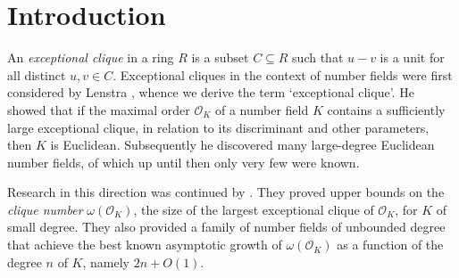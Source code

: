 \documentclass{amsart}
\theoremstyle{plain}
\theoremstyle{definition}
\newcommand{\clq}{C}
\newcommand{\note}[1]{\textbf{\color{blue}#1}}
\newcommand{\inote}[1]{\textbf{\color{red}Ignacio: #1}}
\begin{document}

\section{Introduction}

An \emph{exceptional clique} in a ring \(R\) is a subset \(\clq\subseteq R\) such that \(u-v\) is a unit for all distinct \(u,v\in \clq\). Exceptional cliques in the context of number fields were first considered by Lenstra \cite{Lenstra}, whence we derive the term `exceptional clique'.
He showed that if the maximal order \(\mathcal{O}_K\) of a number field \(K\) contains a sufficiently large exceptional clique, in relation to its discriminant and other parameters, then \(K\) is Euclidean.
Subsequently he discovered many large-degree Euclidean number fields, of which up until then only very few were known.

Research in this direction was continued by \cite{Martinet,Leutbecher}.
They proved upper bounds on the \emph{clique number} \(\omega(\mathcal{O}_K)\), the size of the largest exceptional clique of \(\mathcal{O}_K\), for \(K\) of small degree. They also provided a family of number fields of unbounded degree that achieve the best known asymptotic growth of \(\omega(\mathcal{O}_K)\) as a function of the degree \(n\) of \(K\), namely \(2n+O(1)\).


\end{document}
